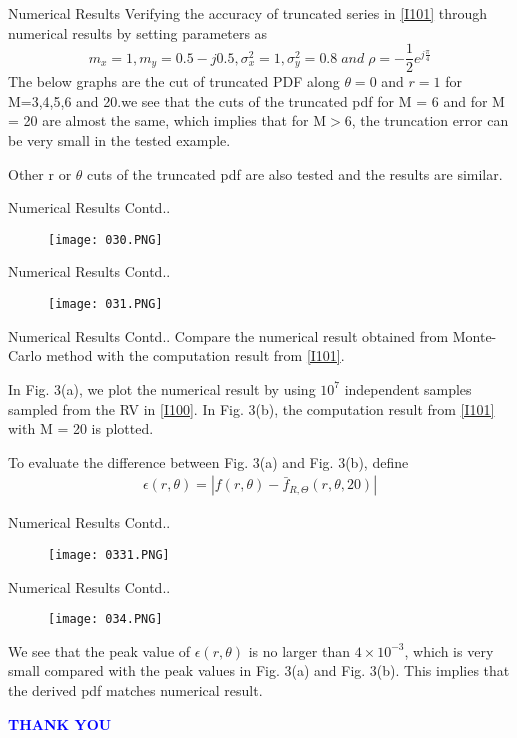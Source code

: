 \documentclass{beamer}
\providecommand{\brak}[1]{\ensuremath{\left(#1\right)}}
\begin{document}
\begin{frame}{Numerical Results}
    Verifying the accuracy of truncated series in \eqref{I101} through numerical results by setting parameters as $$m_x=1, m_y=0.5-j0.5,\sigma_x^2=1,\sigma_y^2=0.8 \;and \;\rho=-\frac{1}{2}e^{j\frac{\pi}{4}}$$
    The below graphs are the cut of truncated PDF along $\theta=0$ and $r=1$ for M=3,4,5,6 and 20.we see that the cuts of the truncated pdf for M = 6 and for M = 20 are almost the same, which implies that for M$>$6, the truncation error can be very small in the tested example.
    
    Other r or $\theta$ cuts of the truncated pdf are also tested and the results are similar.
\end{frame}
\begin{frame}{Numerical Results Contd..}
    \begin{figure}[htp]
    \centering
    \texttt{[image: 030.PNG]}
\end{figure}
\end{frame}
\begin{frame}{Numerical Results Contd..}
    \begin{figure}[htp]
    \centering
    \texttt{[image: 031.PNG]}
\end{figure}
\end{frame}
\begin{frame}{Numerical Results Contd..}
    Compare the numerical result obtained from Monte- Carlo method with the computation result from \eqref{I101}.
    
    In Fig. 3(a), we plot the numerical result by using $10^7$ independent samples sampled from the RV in \eqref{I100}. In Fig. 3(b), the computation result from \eqref{I101} with M = 20 is plotted.
    
    To evaluate the difference between Fig. 3(a) and Fig. 3(b), define
    \begin{align}
        \epsilon(r,\theta)=|f(r,\theta)- \bar{f}_{R,\Theta}\brak{r,\theta,20}|
    \end{align}
\end{frame}
\begin{frame}{Numerical Results Contd..}
    \begin{figure}[htp]
    \centering
    \texttt{[image: 0331.PNG]}
\end{figure}
\end{frame}
\begin{frame}{Numerical Results Contd..}
    \begin{figure}[htp]
    \centering
    \texttt{[image: 034.PNG]}
\end{figure}
We see that the peak value of $\epsilon(r,\theta)$ is no larger than $4 \times 10^{-3}$, which is very small compared with the peak values in Fig. 3(a) and Fig. 3(b). This implies that the derived pdf matches numerical result.
\end{frame}
\begin{frame}
   \centering
    \textcolor{blue}{\Huge{\textbf{THANK YOU}}}
\end{frame}
\end{document}
